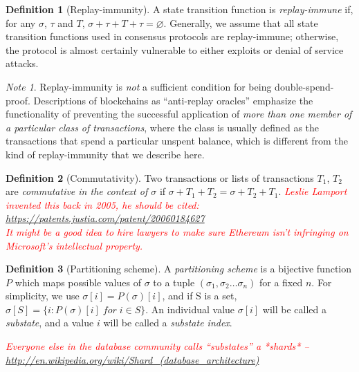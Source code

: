 \documentclass[11pt,a4paper]{report}
\newcommand{\comment}[1]{\textcolor{red}{\textit{#1}}}
\theoremstyle{plain}
\theoremstyle{definition}
\newtheorem{defn}{Definition}[chapter]
\theoremstyle{remark}
\newtheorem*{note}{Note}
\begin{document}
\begin{defn}[Replay-immunity]
A state transition function is \emph{replay-immune} if, for any $\sigma$, $\tau$ and $T$, $\sigma + \tau + T + \tau = \varnothing$. Generally, we assume that all state transition functions used in consensus protocols are replay-immune; otherwise, the protocol is almost certainly vulnerable to either exploits or denial of service attacks.
\end{defn}

\begin{note}
Replay-immunity is \emph{not} a sufficient condition for being double-spend-proof. Descriptions of blockchains as ``anti-replay oracles'' \citep{maxwell_really_2013} emphasize the functionality of preventing the successful application of \emph{more than one member of a particular class of transactions}, where the class is usually defined as the transactions that spend a particular unspent balance, which is different from the kind of replay-immunity that we describe here.
\end{note}

\begin{defn}[Commutativity]
Two transactions or lists of transactions $T_1$, $T_2$ are \emph{commutative in the context of $\sigma$} if $\sigma + T_1 + T_2 = \sigma + T_2 + T_1$.
\comment{Leslie Lamport invented this back in 2005, he should be cited: \url{https://patents.justia.com/patent/20060184627}\\
It might be a good idea to hire lawyers to make sure Ethereum isn't infringing on Microsoft's intellectual property.} 
\end{defn}

\begin{defn}[Partitioning scheme]
A \emph{partitioning scheme} is a bijective function $P$ which maps possible values of $\sigma$ to a tuple $(\sigma_1, \sigma_2 \ldots \sigma_n)$ for a fixed $n$. For simplicity, we use $\sigma[i] = P(\sigma)[i]$, and if S is a set, $\sigma[S] = \{i: P(\sigma)[i] \; for \; i \in S\}$. An individual value $\sigma[i]$ will be called a \emph{substate}, and a value $i$ will be called a \emph{substate index}.

\comment{Everyone else in the database community calls ``substates'' a *shards* -- \url{http://en.wikipedia.org/wiki/Shard_(database_architecture)}}
\end{defn}
\end{document}
